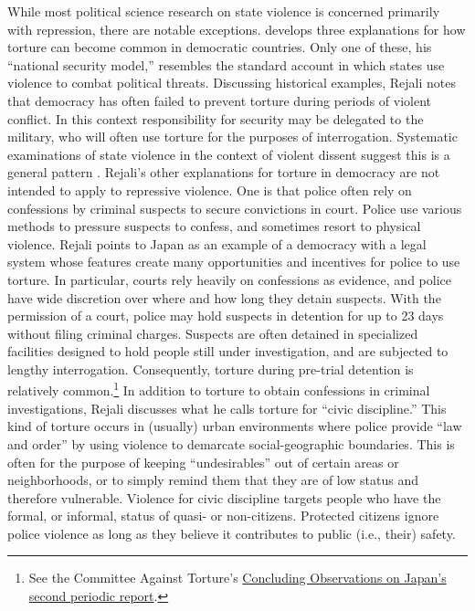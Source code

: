 \documentclass[11pt]{article}
\begin{document}
While most political science research on state violence is concerned primarily with repression, there are notable exceptions. \citet{Rejali2007} develops three explanations for how torture can become common in democratic countries. Only one of these, his ``national security model,'' resembles the standard account in which states use violence to combat political threats. Discussing historical examples, Rejali notes that democracy has often failed to prevent torture during periods of violent conflict. In this context responsibility for security may be delegated to the military, who will often use torture for the purposes of interrogation. Systematic examinations of state violence in the context of violent dissent suggest this is a general pattern \citep{Davenport2007,Davenport2007AR,DavenportMooreArmstrong2007,ConradMoore2010}. Rejali's other explanations for torture in democracy are not intended to apply to repressive violence. One is that police often rely on confessions by criminal suspects to secure convictions in court. Police use various methods to pressure suspects to confess, and sometimes resort to physical violence. Rejali points to Japan as an example of a democracy with a legal system whose features create many opportunities and incentives for police to use torture. In particular, courts rely heavily on confessions as evidence, and police have wide discretion over where and how long they detain suspects. With the permission of a court, police may hold suspects in detention for up to 23 days without filing criminal charges. Suspects are often detained in specialized facilities designed to hold people still under investigation, and are subjected to lengthy interrogation. Consequently, torture during pre-trial detention is relatively common.\footnote{See the Committee Against Torture's \href{https://www.refworld.org/publisher,CAT,,JPN,,,0.html}{Concluding Observations on Japan's second periodic report}.} In addition to torture to obtain confessions in criminal investigations, Rejali discusses what he calls torture for ``civic discipline.'' This kind of torture occurs in (usually) urban environments where police provide ``law and order'' by using violence to demarcate social-geographic boundaries. This is often for the purpose of keeping  ``undesirables'' out of certain areas or neighborhoods, or to simply remind them that they are of low status and therefore vulnerable. Violence for civic discipline targets people who have the formal, or informal, status of quasi- or non-citizens. Protected citizens ignore police violence as long as they believe it contributes to public (i.e., their) safety. 
\end{document}
